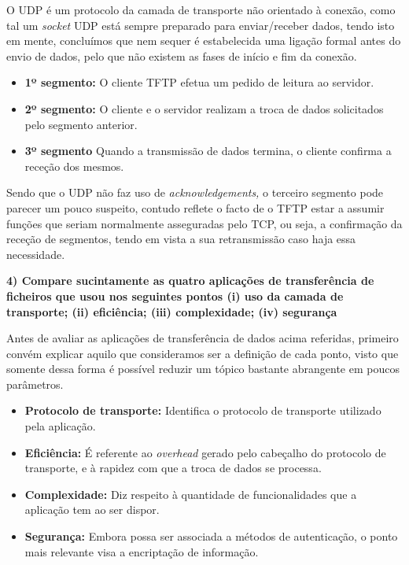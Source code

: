        O UDP é um protocolo da camada de transporte não orientado à conexão, como tal um \textit{socket} UDP está sempre preparado para enviar/receber dados, tendo isto em mente, concluímos que nem sequer é estabelecida uma ligação formal antes do envio de dados, pelo que não existem as fases de início e fim da conexão.

        \begin{itemize}
            \item \textbf{1º segmento:} O  cliente TFTP efetua um pedido de leitura ao servidor.

            \item \textbf{2º segmento:} O cliente e o servidor realizam a troca de dados solicitados pelo segmento anterior.

            \item \textbf{3º segmento} Quando a transmissão de dados termina, o cliente confirma a receção dos mesmos.
        \end{itemize}

        Sendo que o UDP não faz uso de \textit{acknowledgements,} o terceiro segmento pode parecer um pouco suspeito, contudo reflete o facto de o TFTP estar a assumir funções que seriam normalmente asseguradas pelo TCP, ou seja, a confirmação da receção de segmentos, tendo em vista a sua retransmissão caso haja essa necessidade.

        \textbf{4) Compare sucintamente as quatro aplicações de transferência de ficheiros que usou nos seguintes pontos (i) uso da camada de transporte; (ii) eficiência; (iii) complexidade; (iv) segurança}

        Antes de avaliar as aplicações de transferência de dados acima referidas, primeiro convém explicar aquilo que consideramos ser a definição de cada ponto, visto que somente dessa forma é possível reduzir um tópico bastante abrangente em poucos parâmetros. 

        \newpage
        \begin{itemize}
            
            \item \textbf{Protocolo de transporte:} Identifica o protocolo de transporte utilizado pela aplicação.

            \item \textbf{Eficiência:} É referente ao \textit{overhead} gerado pelo cabeçalho do protocolo de transporte, e à rapidez com que a troca de dados se processa.

            \item \textbf{Complexidade:} Diz respeito à quantidade de funcionalidades que a aplicação tem ao ser dispor.

            \item \textbf{Segurança:}  Embora possa ser associada a métodos de autenticação, o ponto mais relevante visa a encriptação de informação.
        
        \end{itemize}

